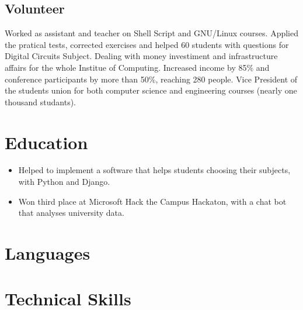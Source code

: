 \documentclass[10pt, a4paper, roman]{moderncv} %
\begin{document}
\subsection{Volunteer}
{
    Worked as assistant and teacher on Shell Script and GNU/Linux courses.
}
{
    Applied the pratical tests, corrected exercises and helped 60 students with questions for Digital Circuits Subject.
}
{ 
    Dealing with money investiment and infrastructure affairs for the whole Institue of Computing.
}
{
    Increased income by 85\% and conference participants by more than 50\%, reaching 280 people.
}
{
    Vice President of the students union for both computer science and engineering courses (nearly one thousand studants).
}
\section{Education}

{
    \begin{itemize}
        \item Helped to implement a software that helps students choosing their subjects, with Python and Django.
        \item Won third place at Microsoft Hack the Campus Hackaton, with a chat bot that analyses university data.
    \end{itemize} 
}

\section{Languages}


\section{Technical Skills}

\end{document}
